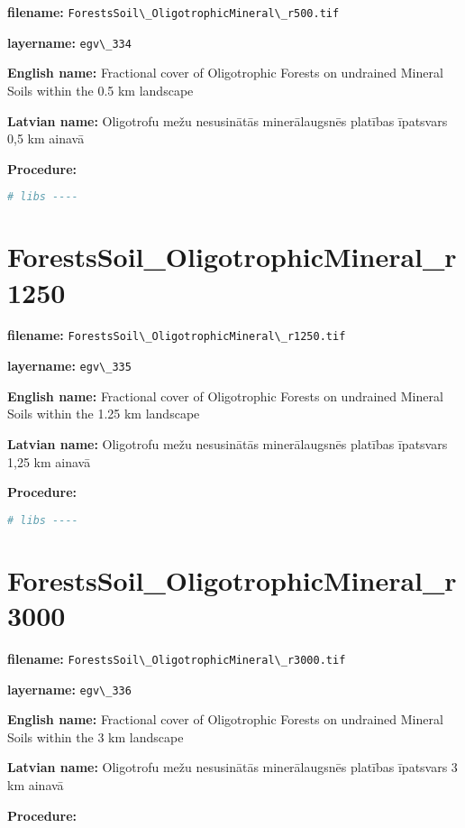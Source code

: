 \documentclass[
]{book}
\newcommand{\passthrough}[1]{#1}
\begin{document}
\textbf{filename:} \passthrough{\lstinline!ForestsSoil\_OligotrophicMineral\_r500.tif!}

\textbf{layername:} \passthrough{\lstinline!egv\_334!}

\textbf{English name:} Fractional cover of Oligotrophic Forests on undrained Mineral Soils within the 0.5 km landscape

\textbf{Latvian name:} Oligotrofu mežu nesusinātās minerālaugsnēs platības īpatsvars 0,5 km ainavā

\textbf{Procedure:}

\begin{lstlisting}[language=R]
# libs ----
\end{lstlisting}

\section{ForestsSoil\_OligotrophicMineral\_r1250}\label{ch06.335}

\textbf{filename:} \passthrough{\lstinline!ForestsSoil\_OligotrophicMineral\_r1250.tif!}

\textbf{layername:} \passthrough{\lstinline!egv\_335!}

\textbf{English name:} Fractional cover of Oligotrophic Forests on undrained Mineral Soils within the 1.25 km landscape

\textbf{Latvian name:} Oligotrofu mežu nesusinātās minerālaugsnēs platības īpatsvars 1,25 km ainavā

\textbf{Procedure:}

\begin{lstlisting}[language=R]
# libs ----
\end{lstlisting}

\section{ForestsSoil\_OligotrophicMineral\_r3000}\label{ch06.336}

\textbf{filename:} \passthrough{\lstinline!ForestsSoil\_OligotrophicMineral\_r3000.tif!}

\textbf{layername:} \passthrough{\lstinline!egv\_336!}

\textbf{English name:} Fractional cover of Oligotrophic Forests on undrained Mineral Soils within the 3 km landscape

\textbf{Latvian name:} Oligotrofu mežu nesusinātās minerālaugsnēs platības īpatsvars 3 km ainavā

\textbf{Procedure:}
\end{document}
